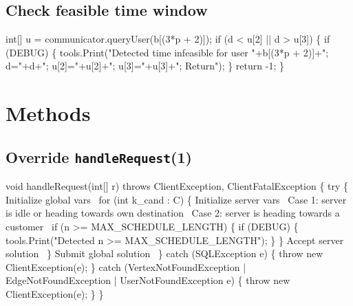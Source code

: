 \documentclass{article}
\def\nwendcode{\endtrivlist \endgroup}      %
\let\nwdocspar=\par
\begin{document}
\subsection{Check feasible time window}
\nwenddocs{}\endmoddef{}
int[] u = communicator.queryUser(b[(3*p + 2)]);
if (d < u[2] || d > u[3]) \{
  if (DEBUG) \{
    tools.Print("Detected time infeasible for user "+b[(3*p + 2)]+"; d="+d+"; u[2]="+u[2]+"; u[3]="+u[3]+"; Return");
  \}
  return -1;
\}
\nwendcode{}\nwdocspar


\section{Methods}

\subsection{Override \texttt{handleRequest}(1)}
\nwenddocs{}\endmoddef{}
void handleRequest(int[] r) throws ClientException, ClientFatalException \{
  try \{
    \LA{}Initialize global vars~{\nwtagstyle{}}\RA{}
    for (int k_cand : C) \{
      \LA{}Initialize server vars~{\nwtagstyle{}}\RA{}
      \LA{}Case 1: server is idle or heading towards own destination~{\nwtagstyle{}}\RA{}
      \LA{}Case 2: server is heading towards a customer~{\nwtagstyle{}}\RA{}
      if (n >= MAX_SCHEDULE_LENGTH) \{
        if (DEBUG) \{
          tools.Print("Detected n >= MAX_SCHEDULE_LENGTH");
        \}
      \}
      \LA{}Accept server solution~{\nwtagstyle{}}\RA{}
    \}
    \LA{}Submit global solution~{\nwtagstyle{}}\RA{}
  \} catch (SQLException e) \{
    throw new ClientException(e);
  \} catch (VertexNotFoundException | EdgeNotFoundException | UserNotFoundException e) \{
    throw new ClientException(e);
  \}
\}
\eatline
{}\nwendcode{}\nwdocspar
\end{document}
